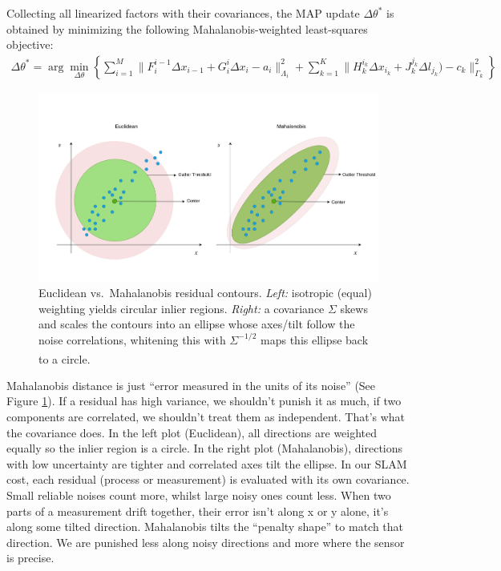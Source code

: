\\ \\
Collecting all linearized factors with their covariances, the MAP update $\Delta\theta^{*}$ is obtained by minimizing the following Mahalanobis-weighted least-squares objective:
\begin{equation}
    \begin{aligned}
        \Delta\theta^{*} = 
        \arg\min_{\Delta\theta}\left\{ 
            \sum_{i=1}^{M}{\|F_{i}^{i-1}\Delta x_{i-1} + G_{i}^{i}\Delta x_{i} - a_i\|_{\Lambda_i}^{2}} +
            \sum_{k=1}^{K}{\|H_{k}^{i_k}\Delta x_{i_k} + J_{k}^{j_k} \Delta l_{j_k}) - c_k\|_{\Gamma_k}^{2}}
            \right\}
    \end{aligned}
    \label{eq:optimizer-iSAM-delta-theta-star-mahalanobis-form}
\end{equation}
\begin{figure}[H]
    \centering
    \includegraphics[width=0.9\linewidth]{Pictures/Optimizers/iSAM/Mahalanobis_Distance.png}
    \caption{Euclidean vs.\ Mahalanobis residual contours. \textit{Left:} isotropic (equal) weighting yields circular inlier regions. \textit{Right:} a covariance $\Sigma$ skews and scales the contours into an ellipse whose axes/tilt follow the noise correlations, whitening this with $\Sigma^{-1/2}$ maps this ellipse back to a circle.\textsuperscript{\cite{mahalanobis_distance_explained}}}
    \label{fig:mahalanobis-distance}
\end{figure}
\noindent
Mahalanobis distance is just ``error measured in the units of its noise'' (See Figure \ref{fig:mahalanobis-distance}). If a residual has high variance, we shouldn't punish it as much, if two components are correlated, we shouldn't treat them as independent. That's what the covariance does. In the left plot (Euclidean), all directions are weighted equally so the inlier region is a circle. In the right plot (Mahalanobis), directions with low uncertainty are tighter and correlated axes tilt the ellipse. In our SLAM cost, each residual (process or measurement) is evaluated with its own covariance. Small reliable noises count more, whilst large noisy ones count less. When two parts of a measurement drift together, their error isn't along x or y alone, it's along some tilted direction. Mahalanobis tilts the ``penalty shape'' to match that direction. We are punished less along noisy directions and more where the sensor is precise.
